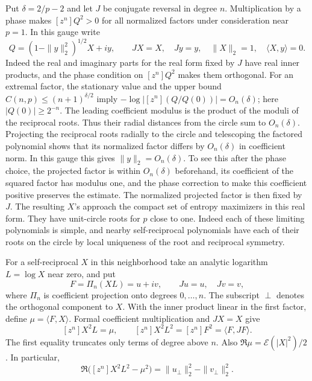 \documentclass[11pt]{article}
\begin{document}
Put \(\delta=2/p-2\) and let \(J\) be conjugate reversal in degree
\(n\). Multiplication by a phase makes \([z^n]Q^2>0\) for all
normalized factors under consideration near \(p=1\).
In this gauge write
\[
 Q=(1-\|y\|_2^2)^{1/2}X+i y,\qquad
 JX=X,\quad Jy=y,\quad \|X\|_2=1,\quad \langle X,y\rangle=0.
\]
Indeed the real and imaginary parts for the real form fixed by
\(J\) have real inner products, and the phase condition on
\([z^n]Q^2\) makes them orthogonal. For an extremal factor, the stationary value and the upper
bound \(C(n,p)\leq(n+1)^{\delta/2}\) imply
\(-\log|[z^n](Q/Q(0))|=O_n(\delta)\); here
\(|Q(0)|\geq2^{-n}\). The leading coefficient modulus is the
product of the moduli of the reciprocal roots. Thus their
radial distances from the circle sum to \(O_n(\delta)\).
Projecting the reciprocal roots radially to the circle and
telescoping the factored polynomial shows that its normalized
factor differs by \(O_n(\delta)\) in coefficient norm. In this
gauge this gives
\(\|y\|_2=O_n(\delta)\). To see this after the phase choice,
the projected factor is within \(O_n(\delta)\) beforehand, its
coefficient of the squared factor has modulus one, and the
phase correction to make this coefficient positive preserves
the estimate. The normalized projected factor is then fixed by
\(J\). The resulting \(X\)'s approach the compact set of
entropy maximizers in this real form. They have unit-circle
roots for \(p\) close to one. Indeed each of these limiting
polynomials is simple, and nearby self-reciprocal polynomials
have each of their roots on the circle by local uniqueness of
the root and reciprocal symmetry.

For a self-reciprocal \(X\) in this neighborhood take an analytic
logarithm \(L=\log X\) near zero, and put
\[
 F=\Pi_n(XL)=u+i v,\qquad Ju=u,\quad Jv=v ,
\]
where \(\Pi_n\) is coefficient projection onto degrees \(0,\ldots,n\).
The subscript \(\perp\) denotes the orthogonal component to \(X\).
With the inner product linear in the first factor, define
\(\mu=\langle F,X\rangle\). Formal coefficient multiplication and
\(JX=X\) give
\[
 [z^n]X^2L=\mu,\qquad
 [z^n]X^2L^2=[z^n]F^2=\langle F,JF\rangle.
\]
The first equality truncates only terms of degree above \(n\).
Also \(\Re\mu=\mathcal E(|X|^2)/2\).
In particular,
\[
 \Re\bigl([z^n]X^2L^2-\mu^2\bigr)
       =\|u_\perp\|_2^2-\|v_\perp\|_2^2 .
\]
\end{document}
